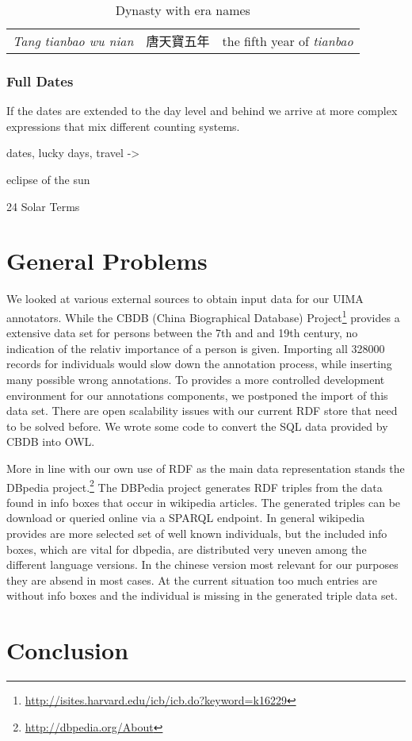 \documentclass[12pt, draft]{article}
\begin{document}
{\footnotesize
\begin{table}[h]
\caption{Dynasty with era names}
\begin{tabular}{lll}
\hline
\emph{Tang tianbao wu nian} & 唐天寶五年 & the fifth year of \emph{tianbao} \\
\end{tabular}
\end{table}
}


\subsubsection{Full Dates}
If the dates are extended to the day level and behind we arrive at more complex
expressions that mix different counting systems.



 
dates, lucky days, travel ->

eclipse of the sun

24 Solar Terms

\section{General Problems}

We looked at various external sources to obtain
input data for our UIMA annotators.
While the 
CBDB (China Biographical Database) Project\footnote{\url{http://isites.harvard.edu/icb/icb.do?keyword=k16229}}
provides a extensive data set for persons between the 7th and and 19th century, 
no indication of the relativ importance of a person is given.
Importing all 328000 records for individuals would slow down 
the annotation process, while inserting many possible wrong annotations.
To provides a more controlled development environment for our annotations
components, we postponed the import of this data set. There are open
scalability issues with our current RDF store that need to be solved before.
We wrote some code to convert the SQL data provided
by CBDB into OWL.

More in line with our own use of RDF as the main data representation
stands the DBpedia project.\footnote{\url{http://dbpedia.org/About}}
The DBPedia project generates RDF triples from the data found in info boxes that occur in wikipedia articles.
The generated triples can be download or queried online via a SPARQL endpoint.
In general wikipedia provides are more selected set of well known individuals,
but the included info boxes, which are vital for dbpedia, are distributed
very uneven among the different language versions. In the chinese version
most relevant for our purposes they are absend in most cases.
At the current situation too much entries
are without info boxes and the individual is missing in the generated triple data set.

\section{Conclusion}



\end{document}
